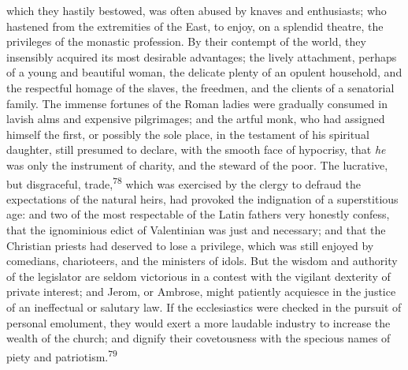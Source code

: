 which they hastily bestowed, was often abused by knaves and
enthusiasts; who hastened from the extremities of the East, to
enjoy, on a splendid theatre, the privileges of the monastic
profession. By their contempt of the world, they insensibly
acquired its most desirable advantages; the lively attachment,
perhaps of a young and beautiful woman, the delicate plenty of an
opulent household, and the respectful homage of the slaves, the
freedmen, and the clients of a senatorial family. The immense
fortunes of the Roman ladies were gradually consumed in lavish
alms and expensive pilgrimages; and the artful monk, who had
assigned himself the first, or possibly the sole place, in the
testament of his spiritual daughter, still presumed to declare,
with the smooth face of hypocrisy, that \textit{he} was only the
instrument of charity, and the steward of the poor. The
lucrative, but disgraceful, trade,\textsuperscript{78} which was exercised by the
clergy to defraud the expectations of the natural heirs, had
provoked the indignation of a superstitious age: and two of the
most respectable of the Latin fathers very honestly confess, that
the ignominious edict of Valentinian was just and necessary; and
that the Christian priests had deserved to lose a privilege,
which was still enjoyed by comedians, charioteers, and the
ministers of idols. But the wisdom and authority of the
legislator are seldom victorious in a contest with the vigilant
dexterity of private interest; and Jerom, or Ambrose, might
patiently acquiesce in the justice of an ineffectual or salutary
law. If the ecclesiastics were checked in the pursuit of personal
emolument, they would exert a more laudable industry to increase
the wealth of the church; and dignify their covetousness with the
specious names of piety and patriotism.\textsuperscript{79}



